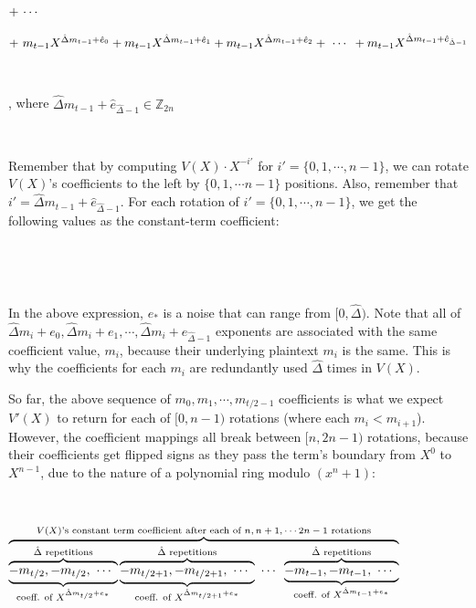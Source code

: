 \text{ } $ + \text{ } \text{$\cdots$} \text{ } $

\text{ } $ + \text{ } m_{t - 1}X^{\hat{\Delta} m_{t - 1} + \hat{e}_0} + m_{t - 1}X^{\hat{\Delta} m_{t - 1} + \hat{e}_1} + m_{t - 1}X^{\hat{\Delta} m_{t - 1} + \hat{e}_2} + \text{ } \text{$\cdots$} \text{ } + m_{t - 1}X^{\hat{\Delta} m_{t - 1} + \hat{e}_{\hat{\Delta} - 1}}$

$ $

\noindent , where $\hat{\Delta} m_{t - 1} + \hat{e}_{\hat{\Delta} - 1} \in \mathbb{Z}_{2n}$

$ $

Remember that by computing $V(X)\cdot X^{-i'}$ for  $i'= \{0, 1, \cdots , n-1\}$, we can rotate $V(X)$'s coefficients to the left by $\{0, 1, \cdots n-1 \}$ positions. Also, remember that $i' = \hat{\Delta} m_{t - 1} + \hat{e}_{\hat{\Delta} - 1}$. For each rotation of $i'= \{0, 1, \cdots , n-1\}$, we get the following values as the constant-term coefficient: 

$ $


$ $

In the above expression, $e_*$ is a noise that can range from $[0, \hat{\Delta})$. Note that all of $\hat\Delta m_i + e_0, \hat\Delta m_i + e_1, \cdots,\hat\Delta m_i + e_{\hat\Delta - 1}$ exponents are associated with the same coefficient value, $m_i$, because their underlying plaintext $m_i$ is the same. This is why the coefficients for each $m_i$ are redundantly used $\hat\Delta$ times in $V(X)$.

So far, the above sequence of $m_0, m_1, \cdots, m_{{t}/{2} - 1}$ coefficients is what we expect $V'(X)$ to return for each of $[0, n-1)$ rotations (where each $m_i < m_{i+1}$). However, the coefficient mappings all break between $[n, 2n -1)$ rotations, because their coefficients get flipped signs as they pass the term's boundary from $X^0$ to $X^{n-1}$, due to the nature of a polynomial ring modulo $(x^n + 1)$: 

$ $

$\overbrace{\overbrace{\underbrace{-m_{t/2}, -m_{t/2}, \text{ } \text{$\cdots$} \text{ }}_{\text{coeff. of } X^{\hat{\Delta}m_{t/2} + e_*}}}^{\hat{\Delta} \text{ repetitions}} \overbrace{\underbrace{-m_{t/2+1}, -m_{t/2+1}, \text{ } \text{$\cdots$} \text{ }}_{\text{coeff. of } X^{\hat{\Delta}m_{t/2+1} + e_*}}}^{\hat{\Delta} \text{ repetitions}} \text{ } \text{$\cdots$} \text{ } \overbrace{\underbrace{-m_{t - 1}, -m_{t - 1}, \text{ } \text{$\cdots$} \text{ }}_{\text{coeff. of } X^{\hat{\Delta}m_{t - 1}+ e_*} }}^{\hat{\Delta} \text{ repetitions}}}^{\text{$V(X)$'s constant term coefficient after each of $n, n+1, \cdots 2n-1$ rotations}}$ 

